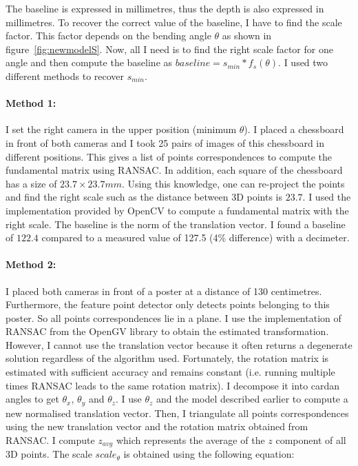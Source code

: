 \documentclass[11pt]{report}
\begin{document}
The baseline is expressed in millimetres, thus the depth is also expressed in millimetres. To recover the correct value of the baseline, I have to find the scale factor. This factor depends on the bending angle $\theta$ as shown in figure~\ref{fig:newmodelS}.
Now, all I need is to find the right scale factor for one angle and then compute the baseline as $baseline = s_{min} * f_s(\theta)$. I used two different methods to recover $s_{min}$. 

\paragraph{Method 1:} I set the right camera in the upper position (minimum $\theta$). I placed a chessboard in front of both cameras and I took 25 pairs of images of this chessboard in different positions. This gives a list of points correspondences to compute the fundamental matrix using RANSAC. In addition, each square of the chessboard has a size of $23.7\times23.7mm$. Using this knowledge, one can re-project the points and find the right scale such as the distance between 3D points is $23.7$. I used the implementation provided by OpenCV to compute a fundamental matrix with the right scale. The baseline is the norm of the translation vector. I found a baseline of $122.4$ compared to a measured value of 127.5 (4\% difference) with a decimeter.

\paragraph{Method 2:} I placed both cameras in front of a poster at a distance of 130 centimetres. Furthermore, the feature point detector only detects points belonging to this poster. So all points correspondences lie in a plane. I use the implementation of RANSAC from the OpenGV library to obtain the estimated transformation. However, I cannot use the translation vector because it often returns a degenerate solution regardless of the algorithm used. Fortunately, the rotation matrix is estimated with sufficient accuracy and remains constant (i.e. running multiple times RANSAC leads to the same rotation matrix). I decompose it into cardan angles to get $\theta_x$, $\theta_y$ and $\theta_z$. I use $\theta_z$ and the model described earlier to compute a new normalised translation vector. Then, I triangulate all points correspondences using the new translation vector and the rotation matrix obtained from RANSAC. I compute $z_{avg}$ which represents the average of the $z$ component of all 3D points. The scale $scale_\theta$ is obtained using the following equation:
\end{document}
